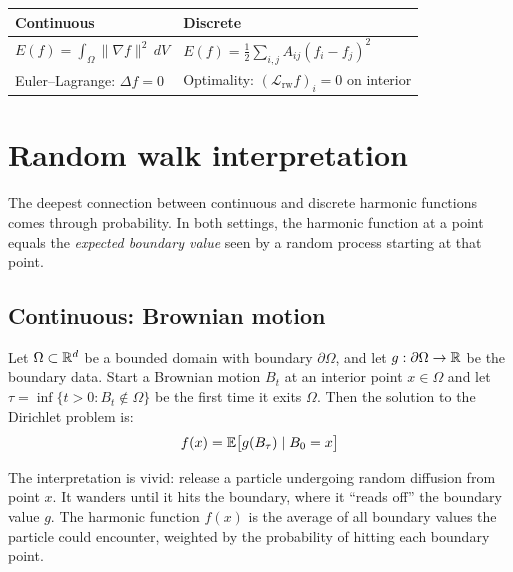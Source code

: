 \begin{notechapter}
\begin{center}
\begin{tabular}{ll}
\toprule
Continuous & Discrete \\
\midrule
$\displaystyle E(f) = \int_\Omega \|\nabla f\|^2\,dV$ &
$\displaystyle E(f) = \frac{1}{2}\sum_{i,j} A_{ij}(f_i - f_j)^2$ \\[6pt]
Euler--Lagrange: $\Delta f = 0$ &
Optimality: $(\mathcal{L}_{\mathrm{rw}} f)_i = 0$ on interior \\
\bottomrule
\end{tabular}
\end{center}


\section{Random walk interpretation}
\label{harmonic-functions:sec:random_walks}

The deepest connection between continuous and discrete harmonic functions
comes through probability. In both settings, the harmonic function at a
point equals the \emph{expected boundary value} seen by a random process
starting at that point.

\subsection{Continuous: Brownian motion}

\begin{theorem}[Kakutani, 1944]
\label{harmonic-functions:thm:kakutani}
Let $\Omega \subset \mathbb{R}^d$ be a bounded domain with boundary
$\partial\Omega$, and let $g : \partial\Omega \to \mathbb{R}$ be the boundary data.
Start a Brownian motion $B_t$ at an interior point $x \in \Omega$ and let
$\tau = \inf\{t > 0 : B_t \notin \Omega\}$ be the first time it exits
$\Omega$. Then the solution to the Dirichlet problem is:
\begin{equation}
f(x) = \mathbb{E}\bigl[g(B_\tau) \mid B_0 = x\bigr]
\end{equation}
\end{theorem}

The interpretation is vivid: release a particle undergoing random
diffusion from point $x$. It wanders until it hits the boundary, where it
``reads off'' the boundary value $g$. The harmonic function $f(x)$ is the
average of all boundary values the particle could encounter, weighted by
the probability of hitting each boundary point.


\end{notechapter}
